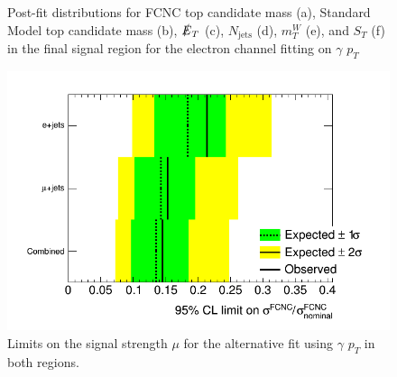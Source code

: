 \begin{figure}[]
\hfil  
{}
\caption{Post-fit distributions for FCNC top candidate mass (a), Standard Model top candidate mass (b), $\slashed{E}_T$ (c), $N_\text{jets}$ (d),  $m_T^W$ (e), and $S_T$ (f) in the final signal region for the electron channel fitting on $\gamma$ $p_T$}
\end{figure}




\begin{figure}[ht!]
	\centering
	\includegraphics[width=0.5\columnwidth]{../ThesisImages/RegionPlots/FinalRegions/Systematics/PhotonPT/LimitPlot.png}
	\caption{Limits on the signal strength $\mu$ for the alternative fit using $\gamma$ $p_T$ in both regions.
	}
\end{figure}


